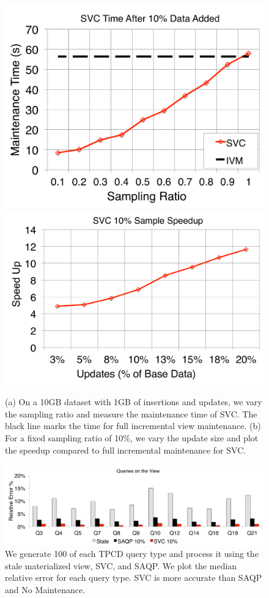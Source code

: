 \begin{figure}[t]
\centering
\includegraphics[scale=0.15]{exp/msj_1.pdf}
\includegraphics[scale=0.15]{exp/msj_2.pdf}
 \caption{(a) On a 10GB dataset with 1GB of insertions and updates, we vary the sampling ratio and measure the maintenance time of SVC. The black line marks the time for full incremental view maintenance. (b) For a fixed sampling ratio of 10\%, we vary the update size and plot the speedup compared to full incremental maintenance for SVC. \label{exp-1-samplesize}}
\end{figure}

\begin{figure}[t]
\centering
\includegraphics[scale=0.16]{exp/msj_3.pdf}
 \caption{We generate 100 of each TPCD query type and process it using the stale materialized view, SVC, and SAQP. We plot the median relative error for each query type. SVC is more accurate than SAQP and No Maintenance.\label{exp-1-acc}}
\end{figure}

